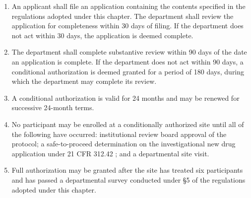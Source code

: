 \begin{enumerate}
\item An applicant shall file an application containing the contents specified
  in the regulations adopted under this chapter. The department shall review the
  application for completeness within 30 days of filing. If the department does
  not act within 30 days, the application is deemed complete.

\item The department shall complete substantive review within 90 days of the
  date an application is complete. If the department does not act within 90
  days, a conditional authorization is deemed granted for a period of 180 days,
  during which the department may complete its review.

\item A conditional authorization is valid for 24 months and may be renewed for
  successive 24-month terms.

\item No participant may be enrolled at a conditionally authorized site until
  all of the following have occurred: institutional review board approval of the
  protocol; a safe-to-proceed determination on the investigational new drug
  application under 21 CFR 312.42 \cite{cfr312}; and a departmental site visit.

\item Full authorization may be granted after the site has treated six
  participants and has passed a departmental survey conducted under §5 of the
  regulations adopted under this chapter.
\end{enumerate}

